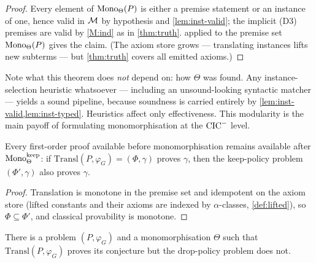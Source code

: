 \begin{proof}
Every element of $\mathrm{Mono}_\Theta(P)$ is either a premise statement or
an instance of one, hence valid in $\mathcal{M}$ by hypothesis and
\cref{lem:inst-valid}; the implicit (D3) premises are valid by
\ref{M:ind} as in \cref{thm:truth}.  
applied to the premise set $\mathrm{Mono}_\Theta(P)$ gives the claim.  (The
axiom store grows --- translating instances lifts new subterms ---
but \cref{thm:truth} covers all emitted axioms.)
\end{proof}

Note what this theorem does \emph{not} depend on: how $\Theta$ was
found.  Any instance-selection heuristic whatsoever --- including an
unsound-looking syntactic matcher --- yields a sound pipeline,
because soundness is carried entirely by
\cref{lem:inst-valid,lem:inst-typed}.  Heuristics affect only
effectiveness.  This modularity is the main payoff of formulating
monomorphisation at the $\mathrm{CIC}^{-}$ level.

\begin{proposition}
\label{prop:mono-conservative}
Every first-order proof available before monomorphisation remains
available after $\mathrm{Mono}^{\mathrm{keep}}_{\Theta}$: if
$\mathrm{Transl}(P, \varphi_G) = (\Phi, \gamma)$ proves $\gamma$,
then the keep-policy problem $(\Phi', \gamma)$ also proves
$\gamma$.
\end{proposition}

\begin{proof}
Translation is monotone in the premise set and idempotent on the
axiom store (lifted constants and their axioms are indexed by
$\alpha$-classes, \cref{def:lifted}), so $\Phi \subseteq \Phi'$, and
classical provability is monotone.
\end{proof}

\begin{proposition}
\label{prop:drop-incomplete}
There is a problem $(P, \varphi_G)$ and a monomorphisation $\Theta$
such that $\mathrm{Transl}(P, \varphi_G)$ proves its conjecture but
the drop-policy problem does not.
\end{proposition}

